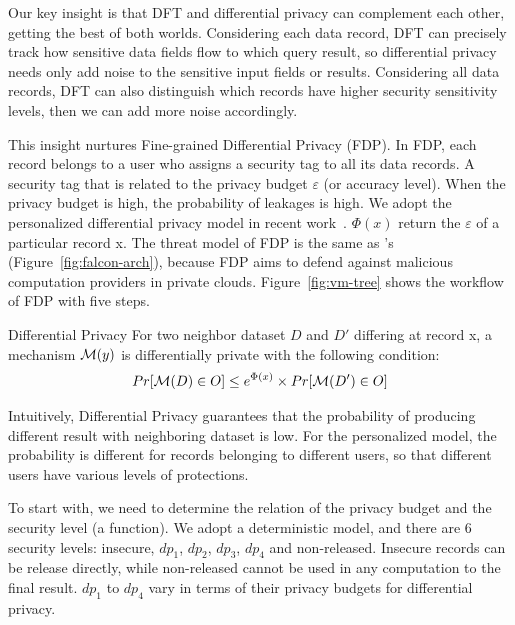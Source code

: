 Our key insight is that DFT and differential privacy can complement each other, 
getting the best of both worlds. Considering each data record, DFT can 
precisely track how sensitive data fields flow to which query result, so 
differential privacy needs only add noise to the sensitive input fields or 
results. Considering all data records, DFT can also distinguish which records 
have higher security sensitivity levels, then we can add more noise accordingly.

This insight nurtures Fine-grained Differential Privacy (FDP). In FDP, each 
record belongs to a user who assigns a security tag to all its data records.
A security tag that is related to the privacy budget $\varepsilon$ (or accuracy 
level). When the privacy budget is high, the probability of leakages is high.
We adopt the personalized differential privacy model in recent
work~\cite{pdp:icde15}. $\Phi(x)$ return the $\varepsilon$ of a particular 
record x. The threat model of FDP is the same as \kakute's 
(Figure~\ref{fig:falcon-arch}), because FDP aims to defend against malicious 
computation providers in private clouds. Figure~\ref{fig:vm-tree} shows the 
workflow of FDP with five steps.

\begin{definition}{Differential Privacy}
For two neighbor dataset $D$ and $D'$ differing at record x,
a mechanism ${\cal M}(y)$ is differentially private with the following 
condition:
\begin{align}
Pr[{\cal M}(D) \in O] \leq e^{\Phi(x)} \times Pr[{\cal M}(D') \in O]
\end{align}
\end{definition}

Intuitively, Differential Privacy guarantees that the probability of
producing different result with neighboring dataset is low. For the 
personalized model, the probability is different for records belonging to 
different users, so that different users have various levels of protections.

To start with, we need to determine the relation of the privacy budget and the 
security level (a  function). We adopt a deterministic model, 
and there are 6 security levels: insecure, $dp_1$, $dp_2$, $dp_3$, $dp_4$ and 
non-released. Insecure records can be release directly, while non-released 
cannot be used in any computation to the final result. $dp_1$ to $dp_4$ vary 
in 
terms of their privacy budgets for differential privacy.

